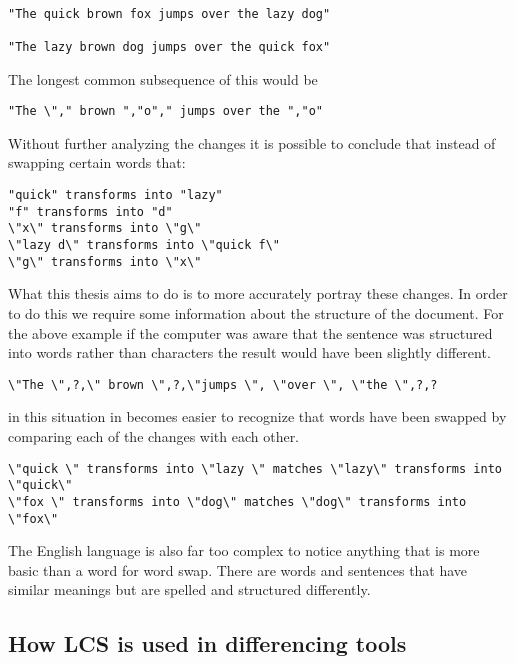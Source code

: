 \begin{verbatim}

"The quick brown fox jumps over the lazy dog"

"The lazy brown dog jumps over the quick fox"

\end{verbatim}

The longest common subsequence of this would be

\begin{verbatim}
"The \"," brown ","o"," jumps over the ","o"
\end{verbatim}

Without further analyzing the changes it is possible to conclude that instead of swapping certain words that:

\begin{verbatim}
"quick" transforms into "lazy"
"f" transforms into "d"
\"x\" transforms into \"g\"
\"lazy d\" transforms into \"quick f\"
\"g\" transforms into \"x\"
\end{verbatim}

What this thesis aims to do is to more accurately portray these changes.
In order to do this we require some information about the structure of the document.
For the above example if the computer was aware that the sentence was structured into words rather than characters the result would have been slightly different.

\begin{verbatim}
\"The \",?,\" brown \",?,\"jumps \", \"over \", \"the \",?,?
\end{verbatim}

in this situation in becomes easier to recognize that words have been swapped by comparing each of the changes with each other.  

\begin{verbatim}
\"quick \" transforms into \"lazy \" matches \"lazy\" transforms into \"quick\"
\"fox \" transforms into \"dog\" matches \"dog\" transforms into \"fox\" 
\end{verbatim}

The English language is also far too complex to notice anything that is more basic than a word for word swap.
There are words and sentences that have similar meanings but are spelled and structured differently.

\subsection{How LCS is used in differencing tools}
